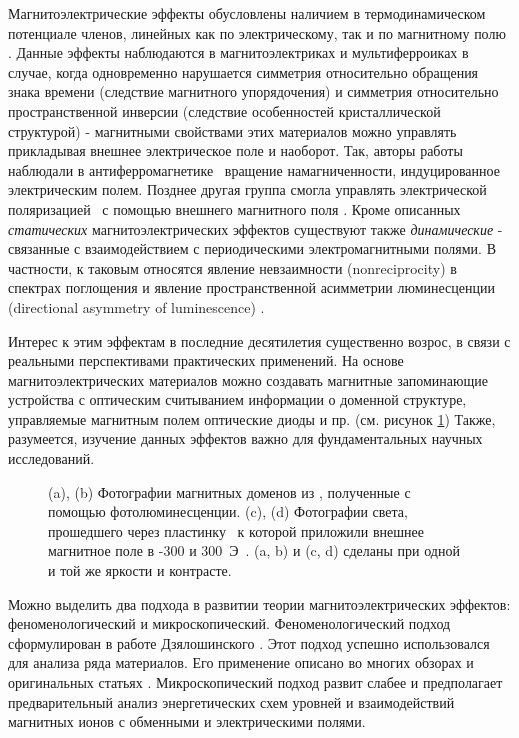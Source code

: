 {\actuality} Магнитоэлектрические эффекты обусловлены наличием в термодинамическом потенциале членов, линейных как по электрическому, так и по магнитному полю \autocite{Landau}. Данные эффекты наблюдаются в магнитоэлектриках и мультиферроиках в случае, когда одновременно нарушается симметрия относительно обращения знака времени (следствие магнитного упорядочения) и симметрия относительно пространственной инверсии (следствие особенностей кристаллической структурой) - магнитными свойствами этих материалов можно управлять прикладывая внешнее электрическое поле и наоборот. Так, авторы работы \autocite{Saito2008ape} наблюдали в антиферромагнетике \cbo\ вращение намагниченности, индуцированное электрическим полем. Позднее другая группа смогла управлять электрической поляризацией \ncbo\ с помощью внешнего магнитного поля \autocite{Khan2013}. Кроме описанных \emph{статических} магнитоэлектрических эффектов существуют также \emph{динамические} - связанные с взаимодействием с периодическими электромагнитными полями. В частности, к таковым относятся явление невзаимности (nonreciprocity) в спектрах поглощения \autocite{Toyoda2015} и явление пространственной асимметрии люминесценции (directional asymmetry of luminescence) \autocite{Toyoda2016}.  

Интерес к этим эффектам в последние десятилетия существенно возрос, в связи с реальными перспективами практических применений. На основе магнитоэлектрических материалов можно создавать магнитные запоминающие устройства с оптическим считыванием информации о доменной структуре, управляемые магнитным полем оптические диоды и пр. (см. рисунок \cref{fig:applications}) Также, разумеется, изучение данных эффектов важно для фундаментальных научных исследований.

\begin{figure}[ht]
	\caption{(a), (b) Фотографии магнитных доменов из \autocite{Toyoda2016}, полученные с помощью фотолюминесценции. (c), (d) Фотографии света, прошедшего через пластинку \cbo\, к которой приложили внешнее магнитное поле в -300 и 300~Э~\autocite{Saito2008jpsj}. (a, b) и (c, d) сделаны при одной и той же яркости и контрасте.}\label{fig:applications}
\end{figure}

Можно выделить два подхода в развитии теории магнитоэлектрических эффектов: феноменологический и микроскопический. Феноменологический подход сформулирован в работе Дзялошинского \autocite{Dzyaloshinskii1959}. Этот подход успешно использовался для анализа ряда материалов. Его применение описано во многих обзорах и оригинальных статьях \autocite{Zvezdin2008, Pyatakov2012, Popkov2016}. Микроскопический подход развит слабее и предполагает предварительный анализ энергетических схем уровней и взаимодействий магнитных ионов с обменными и электрическими полями.

